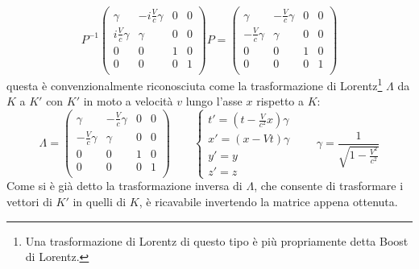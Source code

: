 \begin{equation*}
    P^{-1}\begin{pmatrix}
        \gamma & -i\frac{V}{c}\gamma & 0 & 0\\
        i\frac{V}{c}\gamma & \gamma & 0 & 0\\
        0& 0 & 1 & 0\\
        0& 0 & 0 & 1\\
       \end{pmatrix}
       P=\begin{pmatrix}
        \gamma & -\frac{V}{c}\gamma & 0 & 0\\
        -\frac{V}{c}\gamma & \gamma & 0 & 0\\
        0& 0 & 1 & 0\\
        0& 0 & 0 & 1\\
       \end{pmatrix}
 \end{equation*}
 questa è convenzionalmente riconosciuta come la trasformazione di Lorentz\footnote{Una trasformazione di Lorentz di questo tipo è più propriamente detta Boost di Lorentz.} $\Lambda$ da $K$ a $K'$ con $K'$ in moto a velocità $v$ lungo l'asse $x$ rispetto a $K$:
 \begin{equation}
    \Lambda=
    \begin{pmatrix}
        \gamma & -\frac{V}{c}\gamma & 0 & 0\\
        -\frac{V}{c}\gamma & \gamma & 0 & 0\\
        0& 0 & 1 & 0\\
        0& 0 & 0 & 1\\
       \end{pmatrix}
       \qquad
       \begin{cases}
        t'=(t-\frac{V}{c^2}x)\gamma\\
        x'=(x-Vt)\gamma\\
        y'=y\\
        z'=z
       \end{cases}
       \qquad \gamma=\frac{1}{\sqrt{1-\frac{V^2}{c^2}}}
       \label{TrasformazioneLorentz}
 \end{equation}
Come si è già detto la trasformazione inversa di $\Lambda$, che consente di trasformare i vettori di $K'$ in quelli di $K$, è ricavabile invertendo la matrice appena ottenuta.\\

